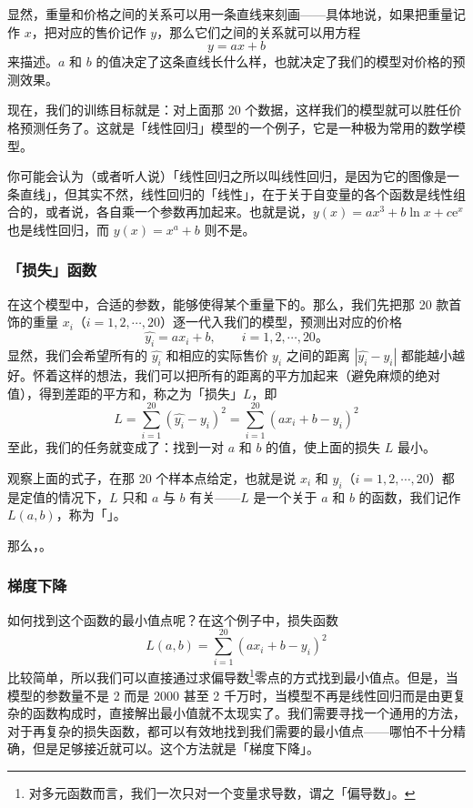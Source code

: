 显然，重量和价格之间的关系可以用一条直线来刻画——具体地说，如果把重量记作 $x$，把对应的售价记作 $y$，那么它们之间的关系就可以用方程
\[
y = ax + b
\]
来描述。$a$ 和 $b$ 的值决定了这条直线长什么样，也就决定了我们的模型对价格的预测效果。

现在，我们的训练目标就是：对上面那 20 个数据，这样我们的模型就可以胜任价格预测任务了。这就是「线性回归」模型的一个例子，它是一种极为常用的数学模型。

\begin{note}
  你可能会认为（或者听人说）「线性回归之所以叫线性回归，是因为它的图像是一条直线」，但其实不然，线性回归的「线性」，在于关于自变量的各个函数是线性组合的，或者说，各自乘一个参数再加起来。也就是说，$y(x) = ax^3 + b \ln x + c \mathrm{e}^x$ 也是线性回归，而 $y(x) = x^a + b$ 则不是。
\end{note}

\subsubsection{「损失」函数}

在这个模型中，合适的参数，能够使得某个重量下的。那么，我们先把那 20 款首饰的重量 $x_i$（$i=1,2,\cdots,20$）逐一代入我们的模型，预测出对应的价格
\[
\hat{y_i} = ax_i + b,\qquad i=1,2,\cdots,20\text{。}
\]
显然，我们会希望所有的 $\hat{y_i}$ 和相应的实际售价 $y_i$ 之间的距离 $|\hat{y_i} - y_i|$ 都能越小越好。怀着这样的想法，我们可以把所有的距离的平方加起来（避免麻烦的绝对值），得到差距的平方和，称之为「损失」$L$，即
\[
L = \sum_{i=1}^{20} (\hat{y_i} - y_i)^2 = \sum_{i=1}^{20} (ax_i + b - y_i)^2
\]
至此，我们的任务就变成了：找到一对 $a$ 和 $b$ 的值，使上面的损失 $L$ 最小。

观察上面的式子，在那 20 个样本点给定，也就是说 $x_i$ 和 $y_i$（$i = 1, 2, \cdots, 20$）都是定值的情况下，$L$ 只和 $a$ 与 $b$ 有关——$L$ 是一个关于 $a$ 和 $b$ 的函数，我们记作 $L(a, b)$，称为「」。

那么，。

\subsubsection{梯度下降}

如何找到这个函数的最小值点呢？在这个例子中，损失函数
\[
L(a, b) = \sum_{i=1}^{20} (ax_i + b - y_i)^2
\]
比较简单，所以我们可以直接通过求偏导数\footnote{对多元函数而言，我们一次只对一个变量求导数，谓之「偏导数」。}零点的方式找到最小值点。但是，当模型的参数量不是 2 而是 2000 甚至 2 千万时，当模型不再是线性回归而是由更复杂的函数构成时，直接解出最小值就不太现实了。我们需要寻找一个通用的方法，对于再复杂的损失函数，都可以有效地找到我们需要的最小值点——哪怕不十分精确，但是足够接近就可以。这个方法就是「梯度下降」。

